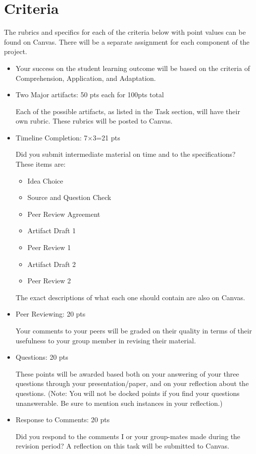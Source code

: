 \documentclass[12pt]{article}
\begin{document}
	\section*{Criteria}
	The rubrics and specifics for each of the criteria below with point values can be found on Canvas.  There will be a separate assignment for each component of the project.
	\begin{itemize}
		\item Your success on the student learning outcome will be based on the criteria of Comprehension, Application, and Adaptation.
		
		\item Two Major artifacts: 50 pts each for 100pts total
		
			Each of the possible artifacts, as listed in the Task section, will have their own rubric. These rubrics will be posted to Canvas.
			
		\item Timeline Completion: 7$\times$3=21 pts
		
			Did you submit intermediate material on time and to the specifications? These items are:
				\begin{itemize}
					\item Idea Choice
					\item Source and Question Check
					\item Peer Review Agreement
					\item Artifact Draft 1
					\item Peer Review 1
					\item Artifact Draft 2
					\item Peer Review 2
				\end{itemize}
			The exact descriptions of what each one should contain are also on Canvas.
			
		\item Peer Reviewing: 20 pts
		
			Your comments to your peers will be graded on their quality in terms of their usefulness to your group member in revising their material.
			
		\item Questions: 20 pts
			
			These points will be awarded based both on your answering of your three questions through your presentation/paper, and on your reflection about the questions. (Note: You will not be docked points if you find your questions unanswerable.  Be sure to mention such instances in your reflection.)
		
		\item Response to Comments: 20 pts
		
			Did you respond to the comments I or your group-mates made during the revision period? A reflection on this task will be submitted to Canvas.
	\end{itemize}
\end{document}
